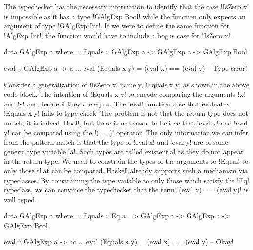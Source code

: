 \documentclass[screen,nonacm,manuscript,review]{acmart} %
\begin{document}
The typechecker has the necessary information to identify that the case
!IsZero x! is impossible as it has a type !GAlgExp Bool! while the
function only expects an argument of type !GAlgExp Int!. If we were to
define the same function for !AlgExp Int!, the function
would have to include a bogus case for !IsZero x!.

\begin{minipage}[ht]{0.6\linewidth}
\begin{CenteredBox}
\begin{code}
data GAlgExp a where
  ...
  Equals :: GAlgExp a -> GAlgExp a -> GAlgExp Bool
\end{code}
\end{CenteredBox}
\end{minipage}%
\begin{minipage}[ht]{0.4\linewidth}
\begin{CenteredBox}
\begin{code}
eval :: GAlgExp a -> a
...
eval (Equals x y) = (eval x) == (eval y)
                           -- Type error!
\end{code}
\end{CenteredBox}
\end{minipage}

Consider a generalization of !IsZero x! namely, !Equals x y! as shown
in the above code block. The intention of !Equals x y! to
encode comparing the arguments !x! and !y! and decide if they are
equal. The !eval! function case that evaluates !Equals x y! fails
to type check. The problem is not that the return type does not match,
it is indeed !Bool!, but there is no reason to believe that
!eval x! and !eval y! can be compared using the !(==)! operator. The
only information we can infer from the pattern match is that
the type of !eval x! and !eval y! are of some generic type variable
!a!. Such types are called existential as they do not appear in
the return type. We need to constrain the types of the
arguments to !Equal! to only those that can be compared.
Haskell already supports such a mechanism via
typeclasses. By constraining the type variable to only those which satisfy
the !Eq! typeclass, we can convince the typechecker that the
term !(eval x) == (eval y)! is well typed.


\begin{minipage}[ht]{0.5\linewidth}
\begin{CenteredBox}
\begin{code}
data GAlgExp a where
...
   Equals :: Eq a => GAlgExp a -> GAlgExp a
                  -> GAlgExp Bool
\end{code}
\end{CenteredBox}
\end{minipage}%
\begin{minipage}[ht]{0.4\linewidth}
\begin{CenteredBox}
\begin{code}
eval :: GAlgExp a -> ac
...
eval (Equals x y) = (eval x) == (eval y)
                              -- Okay!
\end{code}
\end{CenteredBox}
\end{minipage}
\end{document}
